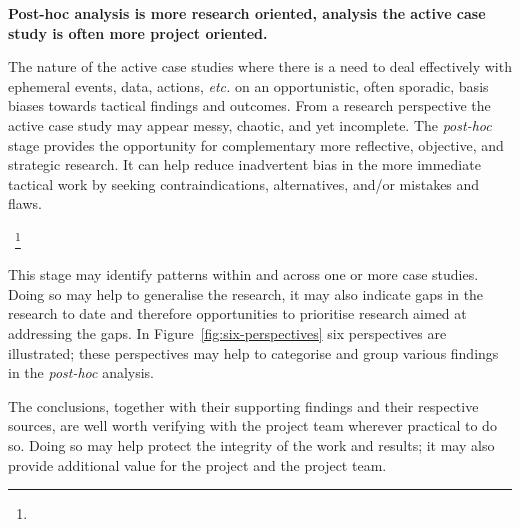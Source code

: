 \textbf{Post-hoc analysis is more research oriented, analysis the active case study is often more project oriented.} 

The nature of the active case studies where there is a need to deal effectively with ephemeral events, data, actions, \textit{etc.} on an opportunistic, often sporadic, basis biases towards tactical findings and outcomes. From a research perspective the active case study may appear messy, chaotic, and yet incomplete. 
The \textit{post-hoc} stage provides the opportunity for complementary more reflective, objective, and strategic research. It can help reduce inadvertent bias in the more immediate tactical work by seeking contraindications, alternatives, and/or mistakes and flaws.

~\footnote{}

This stage may identify patterns within and across one or more case studies. Doing so may help to generalise the research, it may also indicate gaps in the research to date and therefore opportunities to prioritise research aimed at addressing the gaps.
In Figure~\ref{fig:six-perspectives} six perspectives are illustrated; these perspectives may help to categorise and group various findings in the \textit{post-hoc} analysis. 

The conclusions, together with their supporting findings and their respective sources, are well worth verifying with the project team wherever practical to do so. Doing so may help protect the integrity of the work and results; it may also provide additional value for the project and the project team. 

